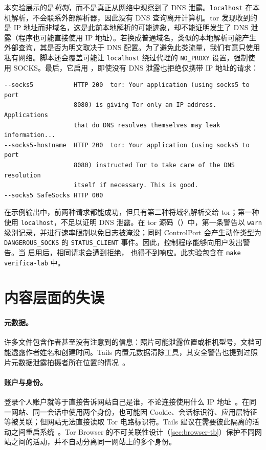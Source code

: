 本实验展示的是\emph{机制}，而不是真正从网络中观察到了 DNS 泄露。\texttt{localhost} 在本机解析，不会联系外部解析器，因此没有 DNS 查询离开计算机。tor 发现收到的是 IP 地址而非域名，这是此前本地解析的可能迹象，却不能证明发生了 DNS 泄露（程序也可能直接使用 IP 地址）。若换成普通域名，类似的本地解析可能产生外部查询，其是否为明文取决于 DNS 配置。为了避免此类流量，我们有意只使用私有网络。脚本还会覆盖可能让 \texttt{localhost} 绕过代理的 \texttt{NO\_PROXY} 设置，强制使用 SOCKS。最后，它启用 ，即使没有 DNS 泄露也拒绝仅携带 IP 地址的请求：
\begin{lstlisting}[numbers=none]
--socks5           HTTP 200  tor: Your application (using socks5 to port
                   8080) is giving Tor only an IP address. Applications
                   that do DNS resolves themselves may leak information...
--socks5-hostname  HTTP 200  tor: Your application (using socks5 to port
                   8080) instructed Tor to take care of the DNS resolution
                   itself if necessary. This is good.
--socks5 SafeSocks HTTP 000
\end{lstlisting}
在示例输出中，前两种请求都能成功，但只有第二种将域名解析交给 tor；第一种使用 \texttt{localhost}，不足以证明 DNS 泄露。在 tor 源码（）中，第一条警告以 \texttt{warn} 级别记录，并进行速率限制以免日志被淹没；同时 ControlPort 会产生动作类型为 \texttt{DANGEROUS\_SOCKS} 的 \texttt{STATUS\_CLIENT} 事件。因此，控制程序能够向用户发出警告。当  启用后，相同请求会遭到拒绝， 也得不到响应。此实验包含在 \texttt{make verifica-lab} 中。

\section{内容层面的失误}\label{sec:opsec-contenuto}

\paragraph{元数据。}许多文件包含作者甚至没有注意到的信息：照片可能泄露位置或相机型号，文档可能透露作者姓名和创建时间。Tails 内置元数据清除工具，其安全警告也提到过照片元数据泄露拍摄者所在位置的情况~\cite{tailswarnings}。

\paragraph{账户与身份。}登录个人账户就等于直接告诉网站自己是谁，不论连接使用什么 IP 地址~\cite{torsafety}。在同一网站、同一会话中使用两个身份，也可能因 Cookie、会话标识符、应用层特征等被关联；但网站无法直接读取 Tor 电路标识符。Tails 建议在需要彼此隔离的活动之间重启系统~\cite{tailswarnings}。Tor Browser 的不可关联性设计（\cref{sec:browser-tb}）保护不同网站之间的活动，并不自动分离同一网站上的多个身份。

